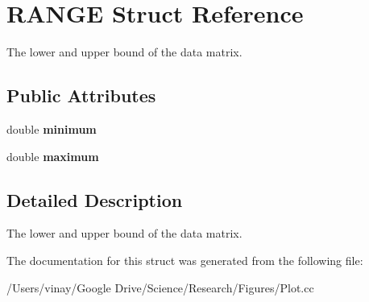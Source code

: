 \hypertarget{struct_r_a_n_g_e}{}\section{R\+A\+N\+G\+E Struct Reference}
\label{struct_r_a_n_g_e}


The lower and upper bound of the data matrix.  


\subsection*{Public Attributes}
\begin{DoxyCompactItemize}
\item 
\hypertarget{struct_r_a_n_g_e_a0581cee8c7a8c493e91c0d3435d26db9}{}double {\bfseries minimum}\label{struct_r_a_n_g_e_a0581cee8c7a8c493e91c0d3435d26db9}

\item 
\hypertarget{struct_r_a_n_g_e_a5fa7dd36152d33805f4dee7100ef2e5c}{}double {\bfseries maximum}\label{struct_r_a_n_g_e_a5fa7dd36152d33805f4dee7100ef2e5c}

\end{DoxyCompactItemize}


\subsection{Detailed Description}
The lower and upper bound of the data matrix. 

The documentation for this struct was generated from the following file\+:\begin{DoxyCompactItemize}
\item 
/\+Users/vinay/\+Google Drive/\+Science/\+Research/\+Figures/Plot.\+cc\end{DoxyCompactItemize}
